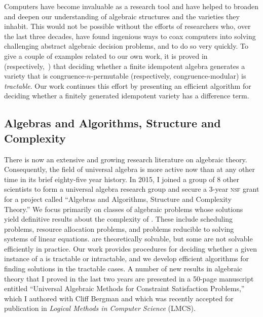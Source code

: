 \documentclass[11pt]{amsart}
\begin{document}
Computers have become invaluable as a research tool and have helped to broaden and deepen our understanding of algebraic structures and the varieties they inhabit.  This would not be possible without  the efforts of researchers who, over the last three decades, have found ingenious ways to coax computers into solving challenging abstract algebraic decision problems, and to do so very quickly.
To give a couple of examples related to our own work, it is proved in~\cite{MR3239624} (respectively,~\cite{Freese:2009}) that deciding whether a finite idempotent algebra generates a variety that is congruence-$n$-permutable (respectively, congruence-modular) is \emph{tractable}. Our work continues this effort by presenting an efficient algorithm for deciding whether a finitely generated idempotent variety has a difference term.

\subsection{Algebras and Algorithms, Structure and Complexity}
\label{sec:csp}
There is now an extensive and growing research literature on algebraic \csp theory. Consequently, the field of universal algebra is more active now than at any other time in its brief eighty-five year history. In 2015, I joined a group of 8 other scientists to form a universal algebra research group and secure a 3-year \textsc{nsf} grant for a project called ``Algebras and Algorithms, Structure and Complexity Theory.'' We focus primarily on classes of algebraic problems whose solutions yield definitive results about the complexity of \csps. These include scheduling problems, resource allocation problems, and problems reducible to solving systems of linear equations. \csps are theoretically solvable, but some are not solvable efficiently in practice.  Our work provides procedures for deciding whether a given instance of a \csp is tractable or intractable, and we develop efficient algorithms for finding solutions in the tractable cases. 
A number of new results in algebraic \csp theory that I proved in the last two years are presented in a 50-page manuscript entitled ``Universal Algebraic Methods for Constraint Satisfaction Problems,''~\cite{Bergman-DeMeo:2016} which I authored with Cliff Bergman and which was recently accepted for publication in \textit{Logical Methods in Computer Science} (LMCS).

\end{document}
